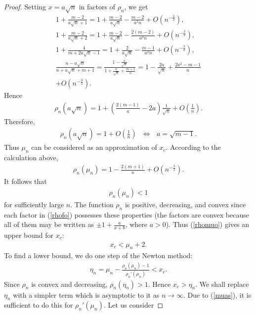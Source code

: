 \documentclass[10pt]{amsart}
\theoremstyle{remark}
\begin{document}
\begin{proof}
Setting $x=a\sqrt{n}$ in factors of $\rho_n$, we get
\begin{eqnarray*}
1+\frac{m-2}{a\sqrt{n}+1}=1+\frac{m-2}{a\sqrt{n}}
-\frac{m-2}{a^2n}+O\left(n^{-\frac32}\right),\\
1+\frac{m-2}{a\sqrt{n}+2}=1+\frac{m-2}{a\sqrt{n}}
-\frac{2(m-2)}{a^2n}+O\left(n^{-\frac32}\right),\\
1+\frac{4}{m+2a\sqrt{n}-1}=1+\frac{2}{a\sqrt{n}}
-\frac{m-1}{a^2n}+O\left(n^{-\frac32}\right),\\
\frac{n-a\sqrt{n}}{n+a\sqrt{n}+m+1}=\frac{1-\frac{a}{\sqrt{n}}}
{1+\frac{a}{\sqrt{n}}+\frac{m+1}{n}} =1-\frac{2a}{\sqrt{n}}
+\frac{2a^2-m-1}{n}\\
+O\left(n^{-\frac32}\right).
\end{eqnarray*}
Hence
\begin{eqnarray*}
\rho_n(a\sqrt{n})=1+\left(\frac{2(m-1)}{a}-2a\right)\frac1{\sqrt{n}}
+O\left(\frac1n\right).
\end{eqnarray*}
Therefore,
\begin{eqnarray*}
\rho_n(a\sqrt{n})=1+O\left(\frac1n\right)~~~\Longleftrightarrow~~~
a=\sqrt{m-1}.
\end{eqnarray*}
Thus $\mu_n$ can be considered as an approximation of $x_c$.
According to the calculation above,
\begin{eqnarray}\label{muas}
\rho_n(\mu_n)=1-\frac{2(m+1)}{n}+ O\left(n^{-\frac32}\right).
\end{eqnarray}
It follows that
\begin{eqnarray}\label{rhomuo}
\rho_n(\mu_n)<1
\end{eqnarray}
for sufficiently large $n$.
The function $\rho_n$ is positive, decreasing, and convex since
each factor in (\ref{rhofo}) possesses these properties (the
factors are convex because all of them may be written as
$\pm1+\frac{a}{x+b}$, where $a>0$).
Thus (\ref{rhomuo}) gives an upper bound for $x_c$:
\begin{eqnarray*}\label{xclemun}
x_c<\mu_n+2.
\end{eqnarray*}
To find a lower bound, we do one step of the Newton method:
\begin{eqnarray*}
\eta_n=\mu_n-\frac{\rho_n(\mu_n)-1}{\rho_n'(\mu_n)}<x_c.
\end{eqnarray*}
Since $\rho_n$ is convex and decreasing, $\rho_n(\eta_n)>1$. Hence
$x_c>\eta_n$. We shall replace $\eta_n$ with a simpler term which
is asymptotic to it as $n\to\infty$. Due to (\ref{muas}), it is
sufficient to do this for $\rho_n'(\mu_n)$. Let us  consider

\end{proof}
\end{document}
